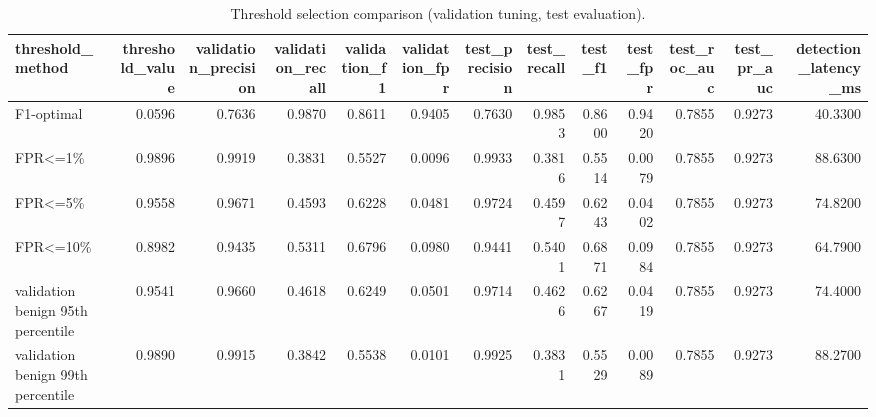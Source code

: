 \begin{table}[t]
\centering
\begin{tabular}{lrrrrrrrrrrrr}
\toprule
threshold\_method & threshold\_value & validation\_precision & validation\_recall & validation\_f1 & validation\_fpr & test\_precision & test\_recall & test\_f1 & test\_fpr & test\_roc\_auc & test\_pr\_auc & detection\_latency\_ms \\
\midrule
F1-optimal & 0.0596 & 0.7636 & 0.9870 & 0.8611 & 0.9405 & 0.7630 & 0.9853 & 0.8600 & 0.9420 & 0.7855 & 0.9273 & 40.3300 \\
FPR<=1\% & 0.9896 & 0.9919 & 0.3831 & 0.5527 & 0.0096 & 0.9933 & 0.3816 & 0.5514 & 0.0079 & 0.7855 & 0.9273 & 88.6300 \\
FPR<=5\% & 0.9558 & 0.9671 & 0.4593 & 0.6228 & 0.0481 & 0.9724 & 0.4597 & 0.6243 & 0.0402 & 0.7855 & 0.9273 & 74.8200 \\
FPR<=10\% & 0.8982 & 0.9435 & 0.5311 & 0.6796 & 0.0980 & 0.9441 & 0.5401 & 0.6871 & 0.0984 & 0.7855 & 0.9273 & 64.7900 \\
validation benign 95th percentile & 0.9541 & 0.9660 & 0.4618 & 0.6249 & 0.0501 & 0.9714 & 0.4626 & 0.6267 & 0.0419 & 0.7855 & 0.9273 & 74.4000 \\
validation benign 99th percentile & 0.9890 & 0.9915 & 0.3842 & 0.5538 & 0.0101 & 0.9925 & 0.3831 & 0.5529 & 0.0089 & 0.7855 & 0.9273 & 88.2700 \\
\bottomrule
\end{tabular}
\caption{Threshold selection comparison (validation tuning, test evaluation).}
\label{tab:threshold-comparison}
\end{table}
